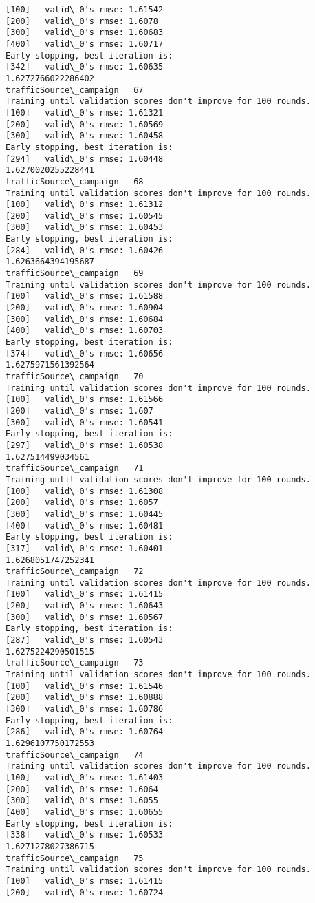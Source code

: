 \documentclass[11pt]{article}
\begin{document}
\begin{Verbatim}[commandchars=\\\{\}]
[100]	valid\_0's rmse: 1.61542
[200]	valid\_0's rmse: 1.6078
[300]	valid\_0's rmse: 1.60683
[400]	valid\_0's rmse: 1.60717
Early stopping, best iteration is:
[342]	valid\_0's rmse: 1.60635
1.6272766022286402
trafficSource\_campaign   67
Training until validation scores don't improve for 100 rounds.
[100]	valid\_0's rmse: 1.61321
[200]	valid\_0's rmse: 1.60569
[300]	valid\_0's rmse: 1.60458
Early stopping, best iteration is:
[294]	valid\_0's rmse: 1.60448
1.6270020255228441
trafficSource\_campaign   68
Training until validation scores don't improve for 100 rounds.
[100]	valid\_0's rmse: 1.61312
[200]	valid\_0's rmse: 1.60545
[300]	valid\_0's rmse: 1.60453
Early stopping, best iteration is:
[284]	valid\_0's rmse: 1.60426
1.6263664394195687
trafficSource\_campaign   69
Training until validation scores don't improve for 100 rounds.
[100]	valid\_0's rmse: 1.61588
[200]	valid\_0's rmse: 1.60904
[300]	valid\_0's rmse: 1.60684
[400]	valid\_0's rmse: 1.60703
Early stopping, best iteration is:
[374]	valid\_0's rmse: 1.60656
1.6275971561392564
trafficSource\_campaign   70
Training until validation scores don't improve for 100 rounds.
[100]	valid\_0's rmse: 1.61566
[200]	valid\_0's rmse: 1.607
[300]	valid\_0's rmse: 1.60541
Early stopping, best iteration is:
[297]	valid\_0's rmse: 1.60538
1.627514499034561
trafficSource\_campaign   71
Training until validation scores don't improve for 100 rounds.
[100]	valid\_0's rmse: 1.61308
[200]	valid\_0's rmse: 1.6057
[300]	valid\_0's rmse: 1.60445
[400]	valid\_0's rmse: 1.60481
Early stopping, best iteration is:
[317]	valid\_0's rmse: 1.60401
1.6268051747252341
trafficSource\_campaign   72
Training until validation scores don't improve for 100 rounds.
[100]	valid\_0's rmse: 1.61415
[200]	valid\_0's rmse: 1.60643
[300]	valid\_0's rmse: 1.60567
Early stopping, best iteration is:
[287]	valid\_0's rmse: 1.60543
1.6275224290501515
trafficSource\_campaign   73
Training until validation scores don't improve for 100 rounds.
[100]	valid\_0's rmse: 1.61546
[200]	valid\_0's rmse: 1.60888
[300]	valid\_0's rmse: 1.60786
Early stopping, best iteration is:
[286]	valid\_0's rmse: 1.60764
1.6296107750172553
trafficSource\_campaign   74
Training until validation scores don't improve for 100 rounds.
[100]	valid\_0's rmse: 1.61403
[200]	valid\_0's rmse: 1.6064
[300]	valid\_0's rmse: 1.6055
[400]	valid\_0's rmse: 1.60655
Early stopping, best iteration is:
[338]	valid\_0's rmse: 1.60533
1.6271278027386715
trafficSource\_campaign   75
Training until validation scores don't improve for 100 rounds.
[100]	valid\_0's rmse: 1.61415
[200]	valid\_0's rmse: 1.60724

\end{Verbatim}
\end{document}
